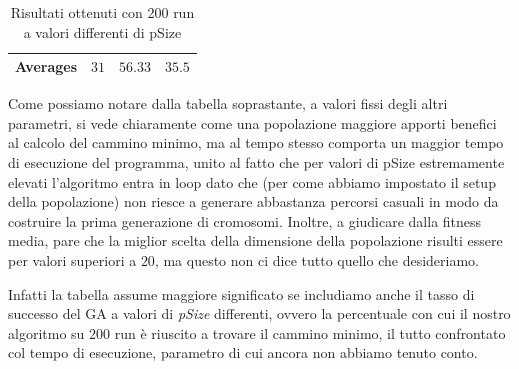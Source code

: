 \begin{center}
\begin{table}[H]
\begin{tabular}{|C{2cm}C{3.25cm}C{3.25cm}C{3.25cm}|}
        
        
        \hline
        
        \textbf{Averages} & $31$ & $56.33$ & $35.5$ \\
        
        \hline
    \end{tabular}
    \caption{Risultati ottenuti con 200 run a valori differenti di pSize}
    \label{tab:table1}
\end{table}
\end{center}
Come possiamo notare dalla tabella soprastante, a valori fissi degli altri parametri, si vede chiaramente come una popolazione maggiore apporti benefici al calcolo del cammino minimo, ma al tempo stesso comporta un maggior tempo di esecuzione del programma, unito al fatto che per valori di pSize estremamente elevati l'algoritmo entra in loop dato che (per come abbiamo impostato il setup della popolazione) non riesce a generare abbastanza percorsi casuali in modo da costruire la prima generazione di cromosomi.
Inoltre, a giudicare dalla fitness media, pare che la miglior scelta della dimensione della popolazione risulti essere per valori superiori a $20$, ma questo non ci dice tutto quello che desideriamo.
\vspace{3mm}

Infatti la tabella assume maggiore significato se includiamo anche il tasso di successo del GA a valori di \textit{pSize} differenti, ovvero la percentuale con cui il nostro algoritmo su $200$ run \`e riuscito a trovare il cammino minimo, il tutto confrontato col tempo di esecuzione, parametro di cui ancora non abbiamo tenuto conto.

